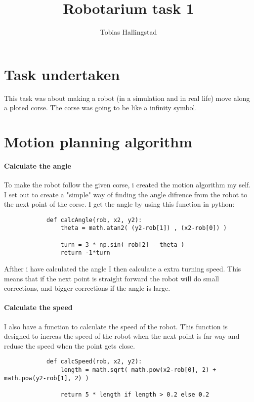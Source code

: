 \documentclass{article}
\title{Robotarium task 1}
\author{Tobias Hallingstad}
\begin{document}
    \maketitle

    \section{Task undertaken}
    This task was about making a robot (in a simulation and in real life) move along a ploted corse. The corse was going to be like a infinity symbol.

    \section{Motion planning algorithm}
    
    \paragraph{Calculate the angle}
        To make the robot follow the given corse, i created the motion algorithm my self. I set out to create a "simple" way of finding the angle difrence from the robot to the next point of the corse. I get the angle by using this function in python:

        \begin{verbatim}
            def calcAngle(rob, x2, y2):
                theta = math.atan2( (y2-rob[1]) , (x2-rob[0]) )

                turn = 3 * np.sin( rob[2] - theta ) 
                return -1*turn
        \end{verbatim}

        Afther i have calculated the angle I then calculate a extra turning speed. This means that if the next point is straight forward the robot will do small corrections, and bigger corrections if the angle is large.

    \paragraph{Calculate the speed}
        I also have a function to calculate the speed of the robot. This function is designed to increas the speed of the robot when the next point is far way and reduse the speed when the point gets close.

        \begin{verbatim}
            def calcSpeed(rob, x2, y2):
                length = math.sqrt( math.pow(x2-rob[0], 2) + math.pow(y2-rob[1], 2) )

                return 5 * length if length > 0.2 else 0.2
        \end{verbatim}
\end{document}
